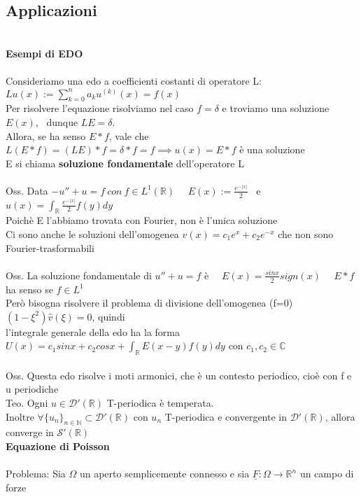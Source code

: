 \documentclass{article}
\theoremstyle{unnumbered}
\theoremstyle{unnumbered1}
\renewcommand{\hat}{\widehat}
\begin{document}
\subsection{Applicazioni}
%
\phantom{}\\
\textbf{Esempi di EDO}\\ \\
%
Consideriamo una edo a coefficienti costanti di operatore L:\ \ $L u(x) := \sum_{k=0}^n a_k u^{(k)}(x)=f(x)$\\
Per risolvere l'equazione risolviamo nel caso $f=\delta$ e troviamo una soluzione $E(x)$, \ dunque $LE=\delta$. \\ 
Allora, se ha senso $E*f$, vale che $L(E*f)=(LE)*f=\delta*f=f \implies u(x)=E*f$ è una soluzione\\
E si chiama \textbf{soluzione fondamentale} dell'operatore L\\ \\
%
%
Oss. Data $-u''+u=f \ con \ f\in L^1(\mathbb{R})$ \ \ $E(x):=\frac{e^{-|x|}}{2}$ \ e \  $u(x)=\int_{\mathbb{R}}\frac{e^{-|x|}}{2}f(y)dy$\\ 
Poichè E l'abbiamo trovata con Fourier, non è l'unica soluzione\\
Ci sono anche le soluzioni dell'omogenea $v(x)=c_1e^x+c_2e^{-x}$ che non sono Fourier-trasformabili\\ \\
%
Oss. La soluzione fondamentale di $u''+u=f$ è \ \ $E(x)=\frac{sinx}{2}sign(x)$ \ \ $E*f$ ha senso se $f\in L^1$\\
Però bisogna risolvere il problema di divisione dell'omogenea (f=0) $(1-\xi^2)\hat{v}(\xi)=0$, quindi\\ l'integrale generale della edo ha la forma $U(x)=c_1sinx+c_2cosx+\int_{\mathbb{R}}E(x-y)f(y)dy$ con $c_1,c_2\in\mathbb{C}$\\ \\
%
%
Oss. Questa edo risolve i moti armonici, che è un contesto periodico, cioè con f e u periodiche\\
%
Teo. Ogni $u\in\mathcal{D}'(\mathbb{R})$ T-periodica è temperata.\\
Inoltre $\forall \{u_n\}_{n\in\mathbb{N}}\subset\mathcal{D}'(\mathbb{R})$ con $u_n$ T-periodica e convergente in $\mathcal{D}'(\mathbb{R})$, allora converge in $\mathcal{S}'(\mathbb{R})$\\ %
%
%
%
\textbf{Equazione di Poisson}\\ \\
%
Problema: Sia $\Omega$ un aperto semplicemente connesso e sia $\underline{F}:\Omega\to\mathbb{R}^n$ un campo di forze\\
\end{document}
